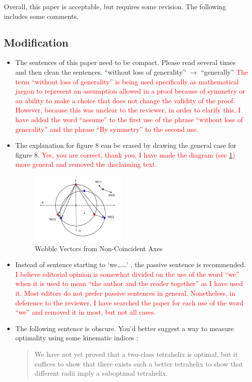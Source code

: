 \documentclass{article}
\newcommand{\highlighttext}[1] {\textcolor{red}{#1}}
\begin{document}
Overall, this paper is acceptable, but requires some revision. The following includes some comments.

\subsection{Modification}
\begin{itemize}
\item
The sentences of this paper need to be compact. Please read several times and then clean
the sentences.
``without loss of generality'' $\rightarrow$ ``generally''
\highlighttext{The term ``without loss of generality'' is being used specifically as mathematical jargon\cite{wiki:wolog} to represent an assumption allowed in a proof because of symmetry or an ability to make
  a choice that does not change the validity of the proof.
  However, because this was unclear to the reviewer, in order to clarify this, I have added the word ``assume'' to the first use of the phrase ``without loss of generality'' and the phrase ``By symmetry'' to the second use.
  }

\item
  The explanation for figure 8 can be erased by drawing the general case for figure 8.
  \highlighttext{Yes, you are correct, thank you, I have made the diagram (see \cref{fig:wobble}) more general and removed the
    disclaiming text.}
    \begin{figure}
     \centering
     \includegraphics[width=0.45\textwidth]{figures/WobbleDiagram2.png}
     \caption{Wobble Vectors from Non-Coincident Axes}
  \label{fig:wobble}
\end{figure}
  \item
    Instead of sentence starting to ‘we……’ , the passive sentence is recommended.
    \highlighttext{
      I believe editorial opinion is somewhat divided\cite{firstperson} on the use of the word ``we'' when it is used to mean ``the author and the reader together'' as I have used it. Most editors do not prefer passive sentences in general.
      Nonetheless, in deference to the reviewer, I have searched the paper for each use of the word ``we'' and
      removed it in most, but not all cases.
      }
    \item 
 The following sentence is obscure. You'd better suggest a way to measure optimality using
 some kinematic indices :
\begin{quote}
 We have not yet proved that a two-class tetrahelix is optimal, but it suffices to show
that there exists such a better tetrahelix to show that different radii imply a suboptimal
tetrahelix.
\end{quote}


\end{itemize}
\end{document}
